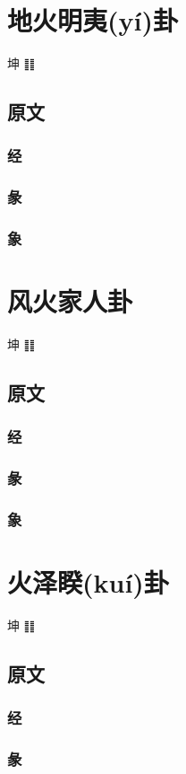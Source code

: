 \documentclass[12pt,oneside]{book}
\begin{document}
\chapter{地火明夷(yí)卦}
坤 ䷁

\section{原文}
\subsection{经}
\subsection{彖}
\subsection{象}


\chapter{风火家人卦}
坤 ䷁

\section{原文}
\subsection{经}
\subsection{彖}
\subsection{象}


\chapter{火泽睽(kuí)卦}
坤 ䷁

\section{原文}
\subsection{经}
\subsection{彖}
\end{document}

